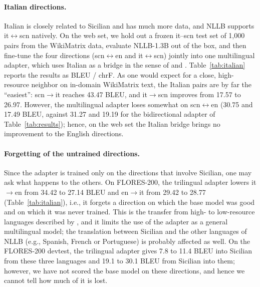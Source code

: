 \documentclass[11pt,a4paper]{article}
\begin{document}
\paragraph{Italian directions.}
Italian is closely related to Sicilian and has much more data, and NLLB supports
it$\leftrightarrow$scn natively. On the web set, we hold out a frozen it--scn test set of 1{,}000
pairs from the WikiMatrix data, evaluate NLLB-1.3B out of the box, and then fine-tune the four
directions (scn$\leftrightarrow$en and it$\leftrightarrow$scn) jointly into one multilingual
adapter, which uses Italian as a bridge in the sense of \citet{johnson2017zeroshot} and
\citet{fan2020beyond}. Table~\ref{tab:italian} reports the results as BLEU / chrF. As one would
expect for a close, high-resource neighbor on in-domain WikiMatrix text, the Italian pairs are by
far the ``easiest'': scn$\rightarrow$it reaches 43.47 BLEU, and it$\rightarrow$scn improves from
17.57 to 26.97. However, the multilingual adapter loses somewhat on scn$\leftrightarrow$en (30.75
and 17.49 BLEU, against 31.27 and 19.19 for the bidirectional adapter of
Table~\ref{tab:results}); hence, on the web set the Italian bridge brings no improvement to the
English directions.





\paragraph{Forgetting of the untrained directions.}
Since the adapter is trained only on the directions that involve Sicilian, one may ask what happens to the others. On FLORES-200, the trilingual adapter lowers it$\to$en from 34.42 to 27.14
BLEU and en$\to$it from 29.42 to 28.77 (Table~\ref{tab:italian}), i.e., it forgets a direction
on which the base model was good and on which it was never trained. This is the transfer from
high- to low-resource languages described by \citet{johnson2017zeroshot}, and it limits the use
of the adapter as a general multilingual model; the translation between Sicilian and the other
languages of NLLB (e.g., Spanish, French or Portuguese) is probably affected as well. On the
FLORES-200 devtest, the trilingual adapter gives 7.8 to 11.4 BLEU into Sicilian from these three
languages and 19.1 to 30.1 BLEU from Sicilian into them; however, we have not scored the base model
on these directions, and hence we cannot tell how much of it is lost.
\end{document}
